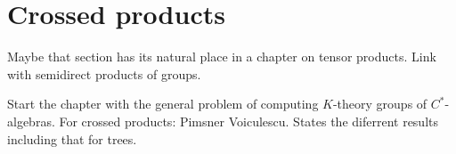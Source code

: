 \section{Crossed products}

Maybe that section has its natural place in a chapter on tensor products. Link with semidirect products of groups.

Start the chapter with the general problem of computing $K$-theory groups of $C^*$-algebras. For crossed products: Pimsner Voiculescu. States the diferrent results including that for trees.

















































